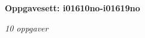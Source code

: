 \centerline{\bf Oppgavesett: i01610no-i01619no}
\vskip 10pt
\centerline{\it 10 oppgaver}\vskip 10pt
\vskip 10pt
